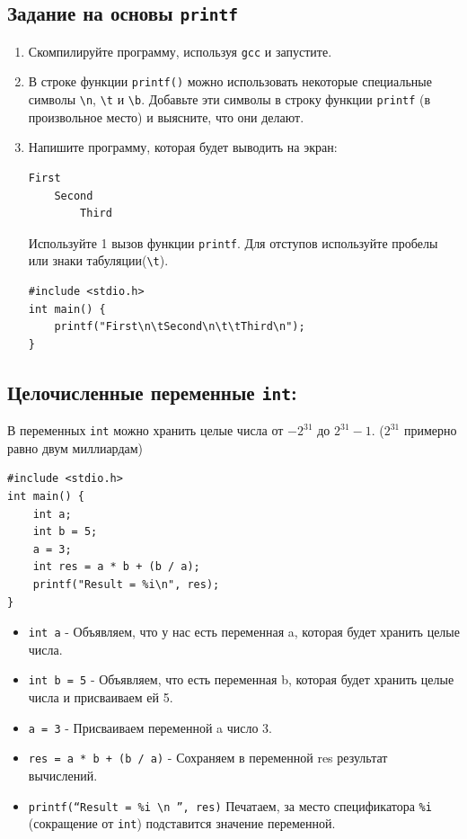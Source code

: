 \documentclass{article}
\begin{document}
\subsection*{Задание на основы \texttt{printf}}
\begin{enumerate}
\item Скомпилируйте программу, используя \texttt{gcc} и запустите.
\item В строке функции \texttt{printf()} можно использовать некоторые специальные символы \texttt{\textbackslash n}, \texttt{\textbackslash t} и \texttt{\textbackslash b}. Добавьте эти символы в строку функции \texttt{printf} (в произвольное место) и выясните, что они делают.
\item Напишите программу, которая будет выводить на экран:
\begin{verbatim}
First
    Second
        Third
\end{verbatim}
Используйте 1 вызов функции \texttt{printf}. Для отступов используйте пробелы или знаки табуляции(\texttt{\textbackslash t}).

\begin{lstlisting}[backgroundcolor = \color{solcolor}]
#include <stdio.h>
int main() {
    printf("First\n\tSecond\n\t\tThird\n");
}
\end{lstlisting}
\end{enumerate}

\subsection*{Целочисленные переменные \texttt{int}:}
В переменных \texttt{int} можно хранить целые числа от $-2^{31}$ до $2^{31} - 1$. ($2^{31}$ примерно равно двум миллиардам)
\begin{lstlisting}
#include <stdio.h>
int main() {
    int a;
    int b = 5;
    a = 3;
    int res = a * b + (b / a);
    printf("Result = %i\n", res);
}
\end{lstlisting}

\begin{itemize}
\item \texttt{int a} - Объявляем, что у нас есть переменная a, которая будет хранить целые числа.
\item \texttt{int b = 5} - Объявляем, что есть переменная b, которая будет хранить целые числа и присваиваем ей 5.
\item \texttt{a = 3} - Присваиваем переменной a число 3.
\item \texttt{res = a * b + (b / a)} - Сохраняем в переменной res результат вычислений.
\item \texttt{printf(``Result = \%i \textbackslash n '', res)} Печатаем, за место спецификатора \texttt{\%i} (сокращение от \texttt{int}) подставится значение переменной.
\end{itemize}
\end{document}

